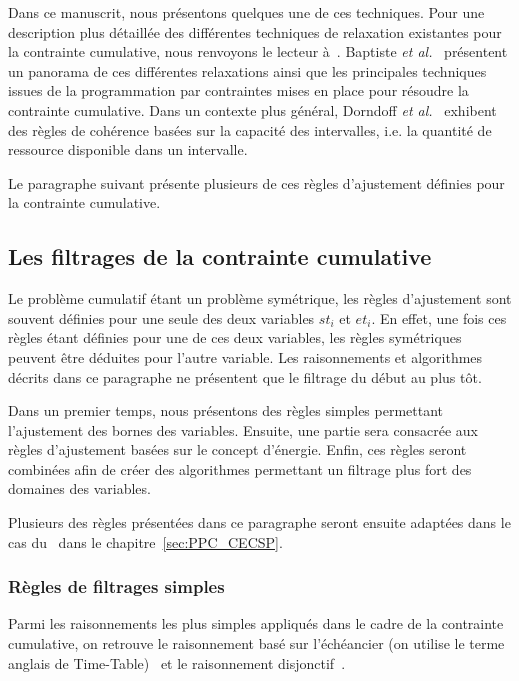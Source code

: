 Dans ce manuscrit, nous présentons quelques une de ces
techniques. Pour une description plus détaillée des différentes
techniques de relaxation existantes pour la contrainte cumulative,
nous renvoyons le lecteur à~\cite{BLPN,DHP}. 
Baptiste {\it et al.}~\cite{BLPN} présentent un panorama de ces
différentes relaxations ainsi que les principales techniques issues de
la programmation par contraintes mises en place pour résoudre la
contrainte cumulative. Dans un contexte plus général, Dorndoff {\it et
al.}~\cite{DHP} exhibent des règles de cohérence basées sur la
capacité des intervalles, i.e. la quantité de ressource disponible
dans un intervalle.

Le paragraphe suivant présente plusieurs de ces règles d'ajustement
définies pour la contrainte cumulative. 


\subsection{Les filtrages de la contrainte cumulative}
\label{sec:cumu_propag}

Le problème cumulatif étant un problème symétrique, les règles
d'ajustement sont souvent définies pour une seule des deux variables
$st_i$ et $et_i$. En effet, une fois ces règles étant définies pour
une de ces deux variables, les règles symétriques peuvent être
déduites pour l'autre variable. Les raisonnements et algorithmes
décrits dans ce paragraphe ne présentent que le filtrage du début au
plus tôt.

Dans un premier temps, nous présentons des règles simples permettant
l'ajustement des bornes des variables. Ensuite, une partie sera
consacrée aux règles d'ajustement basées sur le concept
d'énergie. Enfin, ces règles seront combinées afin de créer
des algorithmes permettant un filtrage plus fort des domaines des
variables.

Plusieurs des règles présentées dans ce paragraphe seront ensuite
adaptées dans le cas du \CECSP~dans le chapitre~\ref{sec:PPC_CECSP}.

\subsubsection{Règles de filtrages simples}

Parmi les raisonnements les plus simples appliqués dans le cadre de la
contrainte cumulative, on retrouve le raisonnement basé sur
l'échéancier (on utilise le terme anglais de Time-Table)~\cite{TTLah}
et le raisonnement disjonctif~\cite{BLPN}.

